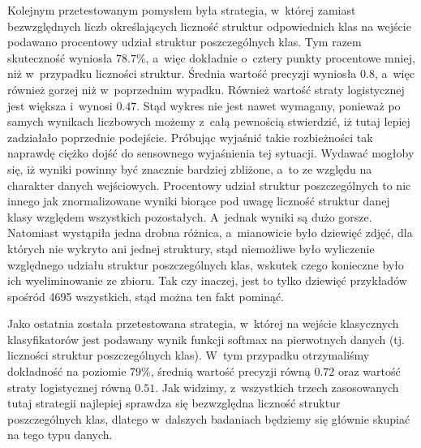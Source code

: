 Kolejnym przetestowanym pomysłem była strategia, w~której zamiast bezwzględnych liczb określających liczność struktur odpowiednich klas na wejście podawano procentowy udział struktur poszczególnych klas. Tym razem skuteczność wyniosła $78.7\%$, a~więc dokładnie o~cztery punkty procentowe mniej, niż w~przypadku liczności struktur. Średnia wartość precyzji wyniosła $0.8$, a~więc również gorzej niż w~poprzednim wypadku. Również wartość straty logistycznej jest większa i~wynosi $0.47$. Stąd wykres nie jest nawet wymagany, ponieważ po samych wynikach liczbowych możemy z~całą pewnością stwierdzić, iż tutaj lepiej zadziałało poprzednie podejście. Próbując wyjaśnić takie rozbieżności tak naprawdę ciężko dojść do sensownego wyjaśnienia tej sytuacji. Wydawać mogłoby się, iż wyniki powinny być znacznie bardziej zbliżone, a~to ze względu na charakter danych wejściowych. Procentowy udział struktur poszczególnych to nic innego jak znormalizowane wyniki biorące pod uwagę liczność struktur danej klasy względem wszystkich pozostałych. A~jednak wyniki są dużo gorsze. Natomiast wystąpiła jedna drobna różnica, a~mianowicie było dziewięć zdjęć, dla których nie wykryto ani jednej struktury, stąd niemożliwe było wyliczenie względnego udziału struktur poszczególnych klas, wskutek czego konieczne było ich wyeliminowanie ze zbioru. Tak czy inaczej, jest to tylko dziewięć przykładów spośród 4695 wszystkich, stąd można ten fakt pominąć. 

Jako ostatnia została przetestowana strategia, w~której na wejście klasycznych klasyfikatorów jest podawany wynik funkcji softmax na pierwotnych danych (tj. liczności struktur poszczególnych klas). W~tym przypadku otrzymaliśmy dokładność na poziomie $79\%$, średnią wartość precyzji równą $0.72$ oraz wartość straty logistycznej równą $0.51$. Jak widzimy, z~wszystkich trzech zasosowanych tutaj strategii najlepiej sprawdza się bezwzględna liczność struktur poszczególnych klas, dlatego w~dalszych badaniach będziemy się głównie skupiać na tego typu danych. 

